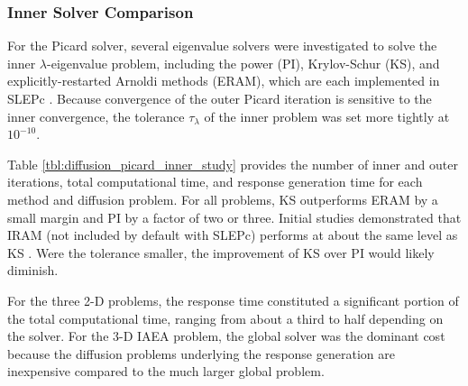 \subsubsection{Inner Solver Comparison}

For the Picard solver, several eigenvalue solvers were investigated 
to solve the inner $\lambda$-eigenvalue problem, including the 
power (PI), Krylov-Schur (KS), and explicitly-restarted Arnoldi 
methods (ERAM), which are each
 implemented in SLEPc \cite{slepc}.  Because convergence of the 
outer Picard iteration is  sensitive to the inner convergence, 
the tolerance $\tau_{\lambda}$ of the inner problem was set 
more tightly at $10^{-10}$.  

Table \ref{tbl:diffusion_picard_inner_study} 
provides the number of inner and outer iterations,  total
computational time, and response generation time 
for each method and diffusion problem.
For all problems, 
KS outperforms ERAM by a small margin and PI by a factor of two 
or three.  Initial studies demonstrated that IRAM (not included 
by default with SLEPc) performs at about the same level 
as KS \cite{roberts2012ksi}. Were the tolerance smaller, the improvement 
of KS over PI would 
likely diminish.

For the three 2-D problems, the response time constituted a significant 
portion of the total computational time, ranging from about a third to half
depending on the solver.  For the 3-D IAEA problem, the global solver
was the dominant cost because the diffusion 
problems underlying the response generation are inexpensive compared to 
the much larger global problem.

